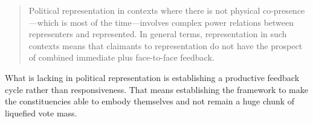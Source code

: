 \begin{quote}
	Political representation in contexts where there is not physical co-presence—which is most of the time—involves complex power relations between representers and represented. In general terms, representation in such contexts means that claimants to representation do not have the prospect of combined immediate plus face-to-face feedback.
\end{quote}

What is lacking in political representation is establishing a productive feedback cycle rather than responsiveness. That means establishing the framework to make the constituencies able to embody themselves  and not remain a huge chunk of liquefied vote mass.

\printbibliography

